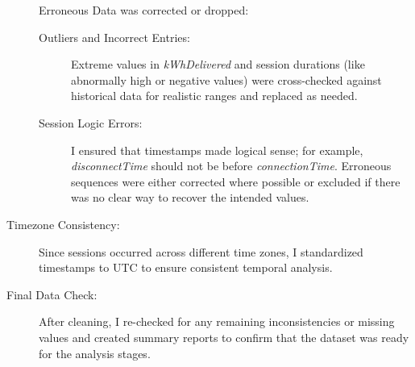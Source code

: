 \begin{description}
        Erroneous Data was corrected or dropped:
        \begin{description}
           \item[Outliers and Incorrect Entries:]
               Extreme values in \textit{kWhDelivered} and session durations (like abnormally high or negative values) were cross-checked against historical data for realistic ranges and replaced as needed.
           \item[Session Logic Errors:]
               I ensured that timestamps made logical sense; for example, \textit{disconnectTime} should not be before \textit{connectionTime}.
               Erroneous sequences were either corrected where possible or excluded if there was no clear way to recover the intended values.
       \end{description}
    \item[Timezone Consistency:]
        Since sessions occurred across different time zones, I standardized timestamps to UTC to ensure consistent temporal analysis.
    \item[Final Data Check:]
        After cleaning, I re-checked for any remaining inconsistencies or missing values and created summary reports to confirm that the dataset was ready for the analysis stages.
\end{description}